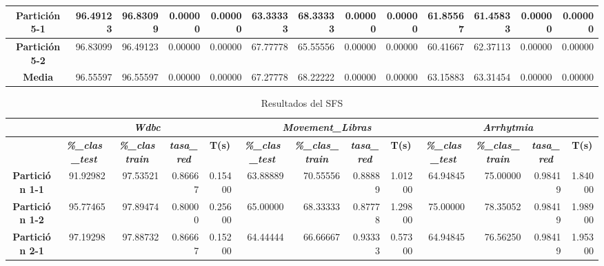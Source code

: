 \documentclass[a4paper,11pt]{article}
\begin{document}
\begin{table}[H]
\begin{adjustbox}{width=1.1\textwidth}
\begin{tabular}{|c|r|r|r|r|r|r|r|r|r|r|r|r|}
    \textbf{Partición 5-1} & 96.49123 & 96.83099 & 0.00000 & 0.00000 & 63.33333 & 68.33333 & 0.00000 & 0.00000 & 61.85567 & 61.45833 & 0.00000 & 0.00000 \\ \hline
    \textbf{Partición 5-2} & 96.83099 & 96.49123 & 0.00000 & 0.00000 & 67.77778 & 65.55556 & 0.00000 & 0.00000 & 60.41667 & 62.37113 & 0.00000 & 0.00000 \\ \hline
    \textbf{Media} & 96.55597 & 96.55597 & 0.00000 & 0.00000 & 67.27778 & 68.22222 & 0.00000 & 0.00000 & 63.15883 & 63.31454 & 0.00000 & 0.00000 \\ \hline
    \end{tabular}
    \end{adjustbox}
    \label{NN3}
  \end{table}
  
   \begin{table}[H]	
    \caption*{Resultados del SFS}
    \begin{adjustbox}{width=1.1\textwidth}
   \begin{tabular}{|c|r|r|r|r|r|r|r|r|r|r|r|r|}
    \hline
    \multicolumn{1}{|l|}{} & \multicolumn{ 4}{c|}{\textbf{\textit{Wdbc}}} & \multicolumn{ 4}{c|}{\textbf{\textit{Movement\_Libras}}} & \multicolumn{ 4}{c|}{\textbf{\textit{Arrhytmia}}} \\ \hline
    \multicolumn{1}{|l|}{} & \multicolumn{1}{c|}{\textbf{\textit{\%\_clas\_test}}} & \multicolumn{1}{c|}{\textbf{\textit{\%\_clas train}}} & \multicolumn{1}{c|}{\textbf{\textit{tasa\_red}}} & \multicolumn{1}{c|}{\textbf{T(s)}} & \multicolumn{1}{c|}{\textbf{\textit{\%\_clas\_test}}} & \multicolumn{1}{c|}{\textbf{\textit{\%\_clas\_train}}} & \multicolumn{1}{c|}{\textbf{\textit{tasa\_red}}} & \multicolumn{1}{c|}{\textbf{T(s)}} & \multicolumn{1}{c|}{\textbf{\textit{\%\_clas\_test}}} & \multicolumn{1}{c|}{\textbf{\textit{\%\_clas\_train}}} & \multicolumn{1}{c|}{\textbf{\textit{tasa\_red}}} & \multicolumn{1}{c|}{\textbf{T(s)}} \\ \hline
    \textbf{Partición 1-1} & 91.92982 & 97.53521 & 0.86667 & 0.15400 & 63.88889 & 70.55556 & 0.88889 & 1.01200 & 64.94845 & 75.00000 & 0.98419 & 1.84000 \\ \hline
    \textbf{Partición 1-2} & 95.77465 & 97.89474 & 0.80000 & 0.25600 & 65.00000 & 68.33333 & 0.87778 & 1.29800 & 75.00000 & 78.35052 & 0.98419 & 1.98900 \\ \hline
    \textbf{Partición 2-1} & 97.19298 & 97.88732 & 0.86667 & 0.15200 & 64.44444 & 66.66667 & 0.93333 & 0.57300 & 64.94845 & 76.56250 & 0.98419 & 1.95300 \\ \hline

\end{tabular}
\end{adjustbox}
\end{table}
\end{document}
